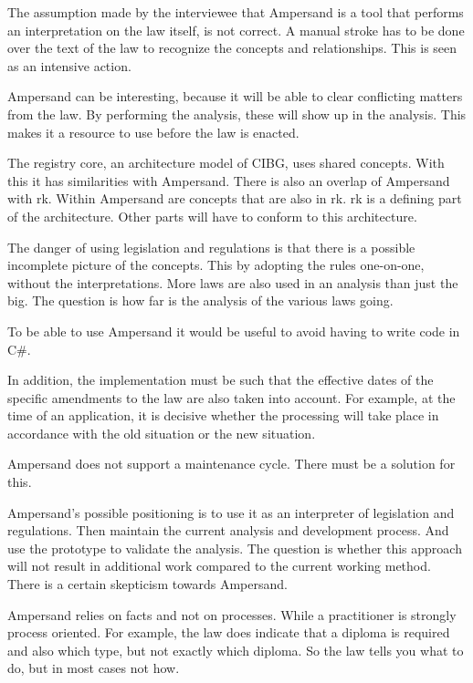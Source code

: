The assumption made by the interviewee that Ampersand is a tool that performs an interpretation on the law itself, is not correct. 
A manual stroke has to be done over the text of the law to recognize the concepts and relationships. 
This is seen as an intensive action.

Ampersand can be interesting, because it will be able to clear conflicting matters from the law. 
By performing the analysis, these will show up in the analysis. 
This makes it a resource to use before the law is enacted.

The registry core, an architecture model of CIBG, uses shared concepts. 
With this it has similarities with Ampersand. 
There is also an overlap of Ampersand with \acrlong{rk}. 
Within Ampersand are concepts that are also in \acrlong{rk}. 
\acrlong{rk} is a defining part of the architecture. Other parts will have to conform to this architecture.

The danger of using legislation and regulations is that there is a possible incomplete picture of the concepts. 
This by adopting the rules one-on-one, without the interpretations.
More laws are also used in an analysis than just the \acrshort{big}. 
The question is how far is the analysis of the various laws going.

To be able to use Ampersand it would be useful to avoid having to write code in C\#.

In addition, the implementation must be such that the effective dates of the specific amendments to the law are also taken into account. 
For example, at the time of an application, it is decisive whether the processing will take place in accordance with the old situation or the new situation.

Ampersand does not support a maintenance cycle. 
There must be a solution for this.

Ampersand's possible positioning is to use it as an interpreter of legislation and regulations. 
Then maintain the current analysis and development process. 
And use the prototype to validate the analysis.
The question is whether this approach will not result in additional work compared to the current working method. 
There is a certain skepticism towards Ampersand.

Ampersand relies on facts and not on processes. 
While a practitioner is strongly process oriented. For example, the law does indicate that a diploma is required and also which type, but not exactly which diploma. 
So the law tells you what to do, but in most cases not how.

